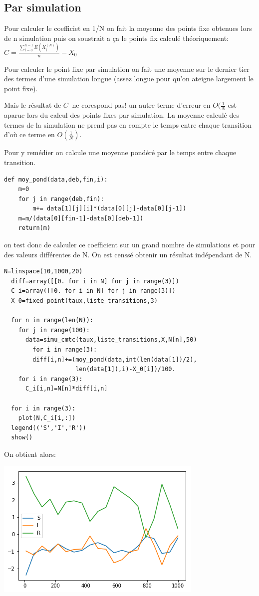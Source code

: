 \documentclass[a4paper]{article}
\begin{document}
\subsection{Par simulation}

Pour calculer le coefficiet en 1/N on fait la moyenne des
points fixe obtenues lors de n simulation puis on soustrait a
ça le points fix calculé théoriquement: $C =
\frac{\sum_{i=0}^{n-1}{E(X^{(N)}_i)}}{n}-X_0 \ $

Pour calculer le point fixe par simulation on fait une moyenne sur le
dernier tier des termes d'une simulation longue (assez longue pour
qu'on ateigne largement le point fixe).

Mais le résultat de $C \ $ ne corespond pas! un autre terme d'erreur en
$O(\frac{1}{N}$ est aparue lors du calcul des points fixes par
simulation. La moyenne calculé des termes de la simulation ne prend
pas en compte le temps entre chaque transition d'où ce terme en
$O(\frac{1}{N})$.

Pour y remédier on calcule une moyenne pondéré par le temps entre
chaque transition.

\begin{lstlisting}[frame=single]
  def moy_pond(data,deb,fin,i):
    m=0
    for j in range(deb,fin):
        m+= data[1][j][i]*(data[0][j]-data[0][j-1])
    m=m/(data[0][fin-1]-data[0][deb-1])
    return(m)
\end{lstlisting}

on test donc de calculer ce coefficient sur un grand nombre de
simulations et pour des valeurs différentes de N. On est censsé
obtenir un résultat indépendant de N.
\newpage

\begin{lstlisting}[frame=single]
  N=linspace(10,1000,20)
  diff=array([[0. for i in N] for j in range(3)])
  C_i=array([[0. for i in N] for j in range(3)])
  X_0=fixed_point(taux,liste_transitions,3)

  for n in range(len(N)):
    for j in range(100):
      data=simu_cmtc(taux,liste_transitions,X,N[n],50)
        for i in range(3):
        diff[i,n]+=(moy_pond(data,int(len(data[1])/2),
                    len(data[1]),i)-X_0[i])/100.
    for i in range(3):
      C_i[i,n]=N[n]*diff[i,n]

  for i in range(3):
    plot(N,C_i[i,:])
  legend(('S','I','R'))
  show()
\end{lstlisting}

On obtient alors:

\includegraphics{figure3.png}
\end{document}
